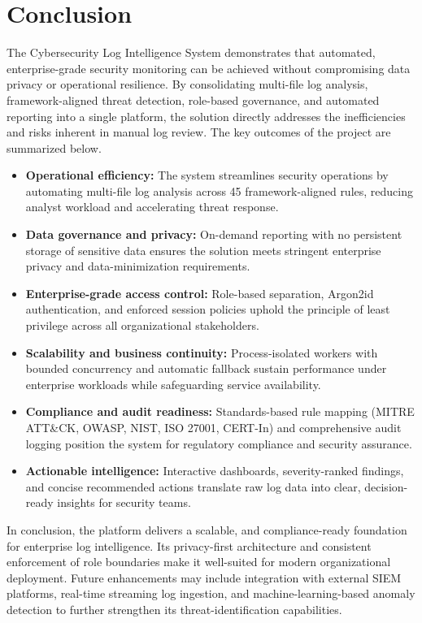 \documentclass[12pt,a4paper]{article}
\begin{document}
\section{Conclusion}
The Cybersecurity Log Intelligence System demonstrates that automated, enterprise-grade
security monitoring can be achieved without compromising data privacy or operational
resilience. By consolidating multi-file log analysis, framework-aligned threat detection,
role-based governance, and automated reporting into a single platform, the solution
directly addresses the inefficiencies and risks inherent in manual log review. The key
outcomes of the project are summarized below.
\begin{itemize}
    \item \textbf{Operational efficiency:} The system streamlines security operations by
          automating multi-file log analysis across 45 framework-aligned rules, reducing
          analyst workload and accelerating threat response.
    \item \textbf{Data governance and privacy:} On-demand reporting with no persistent
          storage of sensitive data ensures the solution meets stringent enterprise
          privacy and data-minimization requirements.
    \item \textbf{Enterprise-grade access control:} Role-based separation, Argon2id
          authentication, and enforced session policies uphold the principle of least
          privilege across all organizational stakeholders.
    \item \textbf{Scalability and business continuity:} Process-isolated workers with
          bounded concurrency and automatic fallback sustain performance under enterprise
          workloads while safeguarding service availability.
    \item \textbf{Compliance and audit readiness:} Standards-based rule mapping
          (MITRE ATT\&CK, OWASP, NIST, ISO 27001, CERT-In) and comprehensive audit
          logging position the system for regulatory compliance and security assurance.
    \item \textbf{Actionable intelligence:} Interactive dashboards, severity-ranked
          findings, and concise recommended actions translate raw log data into clear,
          decision-ready insights for security teams.
\end{itemize}
In conclusion, the platform delivers a scalable, and compliance-ready foundation
for enterprise log intelligence. Its privacy-first architecture and consistent enforcement
of role boundaries make it well-suited for modern organizational deployment. Future
enhancements may include integration with external SIEM platforms, real-time streaming
log ingestion, and machine-learning-based anomaly detection to further strengthen its
threat-identification capabilities.
\end{document}
